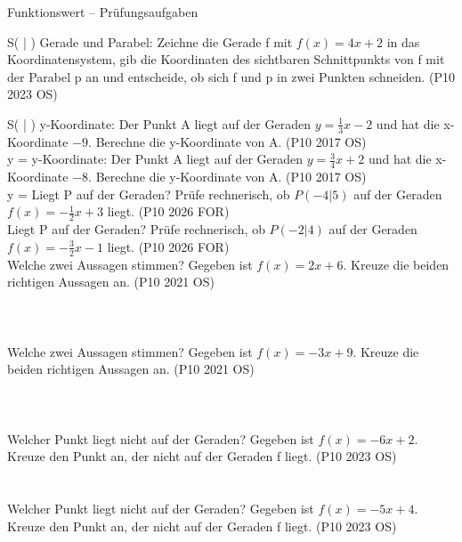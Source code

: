 \begin{aufgabe}{Funktionswert – Prüfungsaufgaben}
\begin{teile}
\begin{ksys}[xmin=-5,xmax=5,ymin=-6,ymax=8]  \end{ksys}
S( \leerfeld | \leerfeld ) \quad \janein
\teil Gerade und Parabel: Zeichne die Gerade f mit $f(x) = 4x + 2$ in das Koordinatensystem, gib die Koordinaten des sichtbaren Schnittpunkts von f mit der Parabel p an und entscheide, ob sich f und p in zwei Punkten schneiden. \hfill (P10 2023 OS) \\

\begin{ksys}[xmin=-5,xmax=5,ymin=-6,ymax=8]  \end{ksys}
S( \leerfeld | \leerfeld ) \quad \janein
\teil y-Koordinate: Der Punkt A liegt auf der Geraden $y = \frac{1}{3}x - 2$ und hat die x-Koordinate $-9$. Berechne die y-Koordinate von A. \hfill (P10 2017 OS) \\ y = \leerfeld
\teil y-Koordinate: Der Punkt A liegt auf der Geraden $y = \frac{3}{4}x + 2$ und hat die x-Koordinate $-8$. Berechne die y-Koordinate von A. \hfill (P10 2017 OS) \\ y = \leerfeld
\teil Liegt P auf der Geraden? Prüfe rechnerisch, ob $P(-4|5)$ auf der Geraden $f(x) = -\frac{1}{2}x + 3$ liegt. \hfill (P10 2026 FOR) \\ \janein
\teil Liegt P auf der Geraden? Prüfe rechnerisch, ob $P(-2|4)$ auf der Geraden $f(x) = -\frac{3}{2}x - 1$ liegt. \hfill (P10 2026 FOR) \\ \janein
\teil Welche zwei Aussagen stimmen? Gegeben ist $f(x) = 2x + 6$. Kreuze die beiden richtigen Aussagen an. \hfill (P10 2021 OS) \\  \\  \\  \\ 
\teil Welche zwei Aussagen stimmen? Gegeben ist $f(x) = -3x + 9$. Kreuze die beiden richtigen Aussagen an. \hfill (P10 2021 OS) \\  \\  \\  \\ 
\teil Welcher Punkt liegt nicht auf der Geraden? Gegeben ist $f(x) = -6x + 2$. Kreuze den Punkt an, der nicht auf der Geraden f liegt. \hfill (P10 2023 OS) \\  \\  \\ 
\teil Welcher Punkt liegt nicht auf der Geraden? Gegeben ist $f(x) = -5x + 4$. Kreuze den Punkt an, der nicht auf der Geraden f liegt. \hfill (P10 2023 OS) \\  \\  \\ 
\end{teile}
\end{aufgabe}

